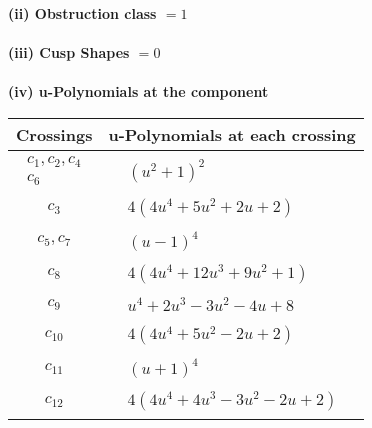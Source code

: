 \documentclass[1p]{elsarticle_modified}
\theoremstyle{definition}
\begin{document}
\flushleft \textbf{(ii) Obstruction class $= 1$}\\~\\
\flushleft \textbf{(iii) Cusp Shapes $= 0$}\\~\\
\newpage\renewcommand{\arraystretch}{1}
\flushleft \textbf{(iv) u-Polynomials at the component}\newline \\
\begin{tabular}{m{50pt}|m{274pt}}
Crossings & \hspace{64pt}u-Polynomials at each crossing \\
\hline $$\begin{aligned}c_{1},c_{2},c_{4}\\c_{6}\end{aligned}$$&$\begin{aligned}
&(u^2+1)^2
\end{aligned}$\\
\hline $$\begin{aligned}c_{3}\end{aligned}$$&$\begin{aligned}
&4(4 u^4+5 u^2+2 u+2)
\end{aligned}$\\
\hline $$\begin{aligned}c_{5},c_{7}\end{aligned}$$&$\begin{aligned}
&(u-1)^4
\end{aligned}$\\
\hline $$\begin{aligned}c_{8}\end{aligned}$$&$\begin{aligned}
&4(4 u^4+12 u^3+9 u^2+1)
\end{aligned}$\\
\hline $$\begin{aligned}c_{9}\end{aligned}$$&$\begin{aligned}
&u^4+2 u^3-3 u^2-4 u+8
\end{aligned}$\\
\hline $$\begin{aligned}c_{10}\end{aligned}$$&$\begin{aligned}
&4(4 u^4+5 u^2-2 u+2)
\end{aligned}$\\
\hline $$\begin{aligned}c_{11}\end{aligned}$$&$\begin{aligned}
&(u+1)^4
\end{aligned}$\\
\hline $$\begin{aligned}c_{12}\end{aligned}$$&$\begin{aligned}
&4(4 u^4+4 u^3-3 u^2-2 u+2)
\end{aligned}$\\
\hline
\end{tabular}\\~\\
\end{document}
